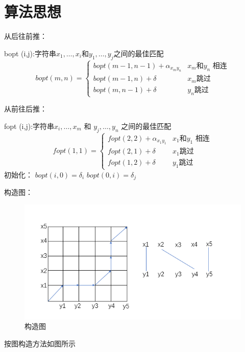 \section{算法思想}
从后往前推：

bopt (i,j):字符串$x_1,\ldots,x_i$和$y_1,\ldots,y_j$之间的最佳匹配
\begin{equation}
	bopt (m,n)=\begin{cases}
		bopt(m-1,n-1)+\alpha_{x_m y_n} & \text{$x_m$和$y_n$ 相连} \\
		bopt (m-1,n)+\delta            & \text{$x_m$跳过}         \\
		bopt (m,n-1)+\delta            & \text{$y_n$跳过}
	\end{cases}
\end{equation}

从前往后推：

fopt (i,j):字符串$x_i,\ldots,x_m$
和
$y_j,\ldots,y_n$
之间的最佳匹配
\begin{equation}
	fopt (1,1)=\begin{cases}
		fopt(2,2)+\alpha_{x_1 y_1} & \text{$x_1$和$y_1$ 相连} \\
		fopt (2,1)+\delta          & \text{$x_1$跳过}         \\
		fopt (1,2)+\delta          & \text{$y_1$跳过}
	\end{cases}
\end{equation}
初始化：
$bopt (i,0) = \delta_i  $    $bopt (0,i) = \delta_j$

构造图：

\begin{figure}[htb]
	\centering
	\includegraphics[scale=0.6]{image/connect2.png}
	\caption{构造图}\label{fig:connect2}
\end{figure}
按图构造方法如图所示
